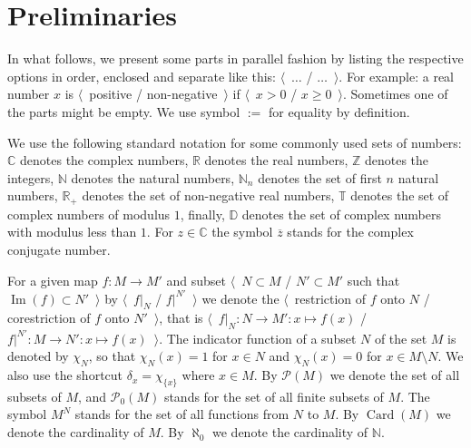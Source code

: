 
\chapter{Preliminaries}\label{ChapterPreliminaries} 


In what follows, we present some parts in parallel fashion by listing the
respective options in order, enclosed and separate like this:
$\langle$~$\ldots$ / $\ldots$~$\rangle$. For example: a real number $x$ is
$\langle$~positive / non-negative~$\rangle$ if $\langle$~$x>0$ / $x\geq
0$~$\rangle$. Sometimes one of the parts might be empty. We use symbol $:=$ for
equality by definition.

We use the following standard notation for some commonly used sets of numbers:
$\mathbb{C}$ denotes the complex numbers, $\mathbb{R}$ denotes the real numbers,
$\mathbb{Z}$ denotes the integers, $\mathbb{N}$ denotes the natural numbers,
$\mathbb{N}_n$ denotes the set of first $n$ natural numbers, $\mathbb{R}_+$
denotes the set of non-negative real numbers, $\mathbb{T}$ denotes the set of
complex numbers of modulus $1$, finally, $\mathbb{D}$ denotes the set of complex
numbers with modulus less than $1$. For $z\in\mathbb{C}$ the symbol
$\overline{z}$ stands for the complex conjugate number.

For a given map $f:M\to M'$ and subset $\langle$~$N\subset M$ / $N'\subset M'$
such that $\operatorname{Im}(f)\subset N'$~$\rangle$ by $\langle$~$f|_N$ /
$f|^{N'}$~$\rangle$ we denote the  $\langle$~restriction of $f$ onto $N$ /
corestriction of $f$ onto $N'$~$\rangle$, that is $\langle$~$f|_N:N\to
M':x\mapsto f(x)$ / $f|^{N'}:M\to N':x\mapsto f(x)$~$\rangle$. The indicator
function of a subset $N$ of the set $M$ is denoted by $\chi_{N}$, so that
$\chi_N(x)=1$ for $x\in N$ and $\chi_N(x)=0$ for $x\in M\setminus N$. We also
use the shortcut $\delta_x=\chi_{ \{x \}}$ where $x\in M$. By $\mathcal{P}(M)$
we denote the set of all subsets of $M$, and $\mathcal{P}_0(M)$ stands for the
set of all finite subsets of $M$. The symbol $M^N$ stands for the set of all
functions from $N$ to $M$. By $\operatorname{Card}(M)$ we denote the cardinality
of $M$. By $\aleph_0$ we denote the cardinality of $\mathbb{N}$.

